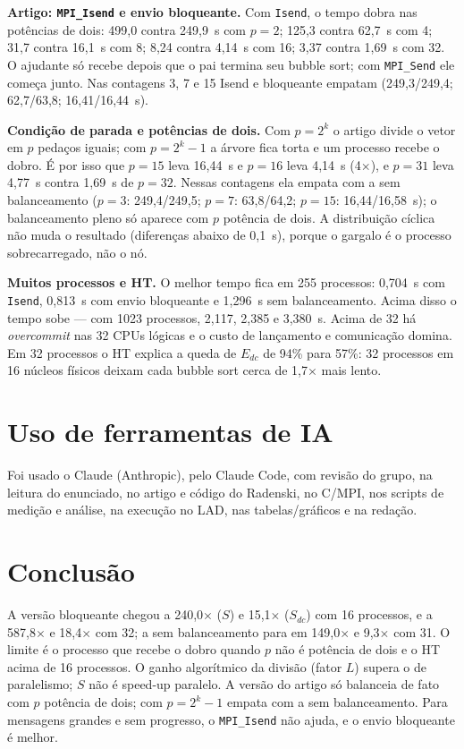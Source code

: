 \documentclass[10pt,twocolumn]{article}
\begin{document}
\textbf{Artigo: \texttt{MPI\_Isend} e envio bloqueante.} Com \texttt{Isend}, o
tempo dobra nas potências de dois: 499,0 contra 249,9~s com $p=2$; 125,3 contra
62,7~s com 4; 31,7 contra 16,1~s com 8; 8,24 contra 4,14~s com 16; 3,37 contra
1,69~s com 32. O ajudante só recebe depois que o pai termina seu bubble sort;
com \texttt{MPI\_Send} ele começa junto. Nas contagens 3, 7 e 15 Isend e
bloqueante empatam (249,3/249,4; 62,7/63,8; 16,41/16,44~s).

\textbf{Condição de parada e potências de dois.} Com $p=2^k$ o artigo divide o
vetor em $p$ pedaços iguais; com $p=2^k-1$ a árvore fica torta e um processo
recebe o dobro. É por isso que $p=15$ leva 16,44~s e $p=16$ leva 4,14~s
(4$\times$), e $p=31$ leva 4,77~s contra 1,69~s de $p=32$. Nessas contagens ela
empata com a sem balanceamento ($p=3$: 249,4/249,5; $p=7$: 63,8/64,2; $p=15$:
16,44/16,58~s); o balanceamento pleno só aparece com $p$ potência de dois. A
distribuição cíclica não muda o resultado (diferenças abaixo de 0,1~s), porque o
gargalo é o processo sobrecarregado, não o nó.

\textbf{Muitos processos e HT.} O melhor tempo fica em 255 processos: 0,704~s
com \texttt{Isend}, 0,813~s com envio bloqueante e 1,296~s sem balanceamento.
Acima disso o tempo sobe --- com 1023 processos, 2,117, 2,385 e 3,380~s. Acima de
32 há \emph{overcommit} nas 32 CPUs lógicas e o custo de lançamento e
comunicação domina. Em 32 processos o HT explica a queda de $E_{dc}$ de 94\%
para 57\%: 32 processos em 16 núcleos físicos deixam cada bubble sort cerca de
1,7$\times$ mais lento.

\section{Uso de ferramentas de IA}

Foi usado o Claude (Anthropic), pelo Claude Code, com revisão do grupo, na
leitura do enunciado, no artigo e código do Radenski, no C/MPI, nos scripts de
medição e análise, na execução no LAD, nas tabelas/gráficos e na redação.

\section{Conclusão}

A versão bloqueante chegou a 240,0$\times$ ($S$) e 15,1$\times$ ($S_{dc}$) com 16
processos, e a 587,8$\times$ e 18,4$\times$ com 32; a sem balanceamento para em
149,0$\times$ e 9,3$\times$ com 31. O limite é o processo que recebe o dobro
quando $p$ não é potência de dois e o HT acima de 16 processos. O ganho
algorítmico da divisão (fator $L$) supera o de paralelismo; $S$ não é speed-up
paralelo. A versão do artigo só balanceia de fato com $p$
potência de dois; com $p=2^k-1$ empata com a sem balanceamento. Para mensagens
grandes e sem progresso, o \texttt{MPI\_Isend} não ajuda, e o envio bloqueante é
melhor.
\end{document}
